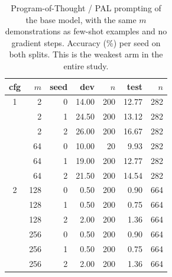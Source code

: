 \begin{table}[t]\centering\small
\setlength{\tabcolsep}{4pt}
\caption{Program-of-Thought / PAL prompting of the base model, with the same
$m$ demonstrations as few-shot examples and no gradient steps. Accuracy (\%)
per seed on both splits. This is the weakest arm in the entire study.}
\label{tab:supp-pot}
\begin{tabular}{cr r rr rr}
\toprule
cfg & $m$ & seed & dev & $n$ & test & $n$ \\
\midrule
1 & 2 & 0 & 14.00 & 200 & 12.77 & 282 \\
 & 2 & 1 & 24.50 & 200 & 13.12 & 282 \\
 & 2 & 2 & 26.00 & 200 & 16.67 & 282 \\
 & 64 & 0 & 10.00 & 20 & 9.93 & 282 \\
 & 64 & 1 & 19.00 & 200 & 12.77 & 282 \\
 & 64 & 2 & 21.50 & 200 & 14.54 & 282 \\
2 & 128 & 0 & 0.50 & 200 & 0.90 & 664 \\
 & 128 & 1 & 0.50 & 200 & 0.75 & 664 \\
 & 128 & 2 & 2.00 & 200 & 1.36 & 664 \\
 & 256 & 0 & 0.50 & 200 & 0.90 & 664 \\
 & 256 & 1 & 0.50 & 200 & 0.75 & 664 \\
 & 256 & 2 & 2.00 & 200 & 1.36 & 664 \\
\bottomrule
\end{tabular}
\end{table}

